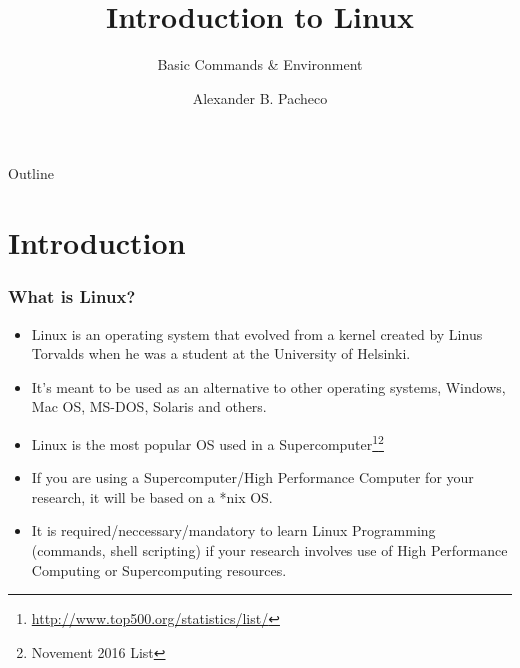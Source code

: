 \documentclass[10pt,t]{beamer}
\title{Introduction to Linux}
\subtitle{Basic Commands \& Environment}
\author{Alexander B. Pacheco}
\institute{\href{http://researchcomputing.lehigh.edu}{LTS Research Computing}}%
\date{ }
\begin{document}
\begin{frame}[c]
  \titlepage
\end{frame}

\footnotesize
\begin{frame}{Outline}
  \tableofcontents
\end{frame}

\section{Introduction}
\begin{frame}
  \frametitle{What is Linux?}
  \begin{itemize}
    \item Linux is an operating system that evolved from a kernel created by Linus Torvalds when he was a student at the University of Helsinki. 
    \item It's meant to be used as an alternative to other operating systems, Windows, Mac OS, MS-DOS, Solaris and others. 
    \item Linux is the most popular OS used in a Supercomputer\let\thefootnote\relax\footnote{\tiny \url{http://www.top500.org/statistics/list/}}\let\thefootnote\relax\footnote{\tiny Novement 2016 List}
      
    \item If you are using a Supercomputer/High Performance Computer for your research, it will be based on a *nix OS.
    \item It is required/neccessary/mandatory to learn Linux Programming (commands, shell scripting) if your research involves use of High Performance Computing or Supercomputing resources.
  \end{itemize}
\end{frame}
\end{document}
